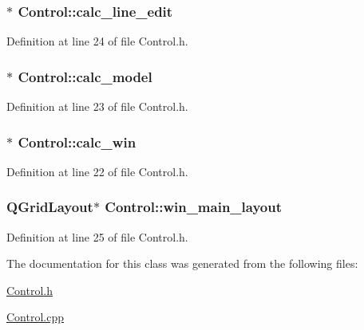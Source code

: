 \subsubsection[{calc\+\_\+line\+\_\+edit}]{$\ast$ Control\+::calc\+\_\+line\+\_\+edit\hspace{0.3cm}{\ttfamily [protected]}}\label{classControl_ae666eb91a7f9f964a07e779798cd18c8}


Definition at line 24 of file Control.\+h.

\hypertarget{classControl_a249421d8ef527bd40991b557daec911c}{}
\subsubsection[{calc\+\_\+model}]{$\ast$ Control\+::calc\+\_\+model\hspace{0.3cm}{\ttfamily [protected]}}\label{classControl_a249421d8ef527bd40991b557daec911c}


Definition at line 23 of file Control.\+h.

\hypertarget{classControl_a377fd2daac62819ac5856cc2a852c550}{}
\subsubsection[{calc\+\_\+win}]{$\ast$ Control\+::calc\+\_\+win\hspace{0.3cm}{\ttfamily [protected]}}\label{classControl_a377fd2daac62819ac5856cc2a852c550}


Definition at line 22 of file Control.\+h.

\hypertarget{classControl_ab3a44edbe7c336f435e0d0e8d2258e0d}{}
\subsubsection[{win\+\_\+main\+\_\+layout}]{\setlength{\rightskip}{0pt plus 5cm}Q\+Grid\+Layout$\ast$ Control\+::win\+\_\+main\+\_\+layout\hspace{0.3cm}{\ttfamily [protected]}}\label{classControl_ab3a44edbe7c336f435e0d0e8d2258e0d}


Definition at line 25 of file Control.\+h.



The documentation for this class was generated from the following files\+:\begin{DoxyCompactItemize}
\item 
\hyperlink{Control_8h}{Control.\+h}\item 
\hyperlink{Control_8cpp}{Control.\+cpp}\end{DoxyCompactItemize}
